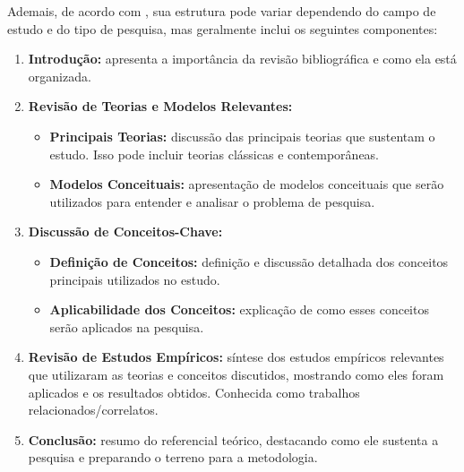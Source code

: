 Ademais, de acordo com , sua estrutura pode variar dependendo do campo de estudo e do tipo de pesquisa, mas geralmente inclui os seguintes componentes:
\begin{enumerate}[label=\roman*., itemsep=0pt, leftmargin=2.5cm]
    \item \textbf{Introdução:} apresenta a importância da revisão bibliográfica e como ela está organizada.
    \item \textbf{Revisão de Teorias e Modelos Relevantes:}
        \begin{itemize}
            \item \textbf{Principais Teorias:} discussão das principais teorias que sustentam o estudo. Isso pode incluir teorias clássicas e contemporâneas.
            \item \textbf{Modelos Conceituais:} apresentação de modelos conceituais que serão utilizados para entender e analisar o problema de pesquisa.
        \end{itemize}
    \item \textbf{Discussão de Conceitos-Chave:}
        \begin{itemize}
            \item \textbf{Definição de Conceitos:} definição e discussão detalhada dos conceitos principais utilizados no estudo.
            \item \textbf{Aplicabilidade dos Conceitos:} explicação de como esses conceitos serão aplicados na pesquisa.
        \end{itemize}
    \item \textbf{Revisão de Estudos Empíricos:} síntese dos estudos empíricos relevantes que utilizaram as teorias e conceitos discutidos, mostrando como eles foram aplicados e os resultados obtidos. Conhecida como trabalhos relacionados/correlatos.
    \item \textbf{Conclusão:} resumo do referencial teórico, destacando como ele sustenta a pesquisa e preparando o terreno para a metodologia.
\end{enumerate}

